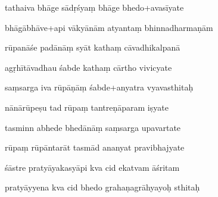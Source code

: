 \documentclass[article,12pt,a4paper]{memoir}%
\newcounter{parCount}
\begin{document}
	  
	  \pstart {} tathaiva bhāge sādṛśyaṃ bhāge bhedo+avasīyate 
	{}
	\pend%
      

	  
	  \pstart \leavevmode%
	bhāgābhāve+api vākyānām atyantaṃ bhinnadharmaṇām 
	{}
	\pend%
      

	  
	  \pstart {} rūpanāśe padānāṃ syāt kathaṃ cāvadhikalpanā 
	{}
	\pend%
      

	  
	  \pstart \leavevmode%
	agṛhītāvadhau śabde kathaṃ cārtho vivicyate 
	{}
	\pend%
      

	  
	  \pstart {} saṃsarga iva rūpāṇāṃ śabde+anyatra vyavasthitaḥ 
	{}
	\pend%
      

	  
	  \pstart \leavevmode%
	nānārūpeṣu tad rūpaṃ tantreṇāparam iṣyate 
	{}
	\pend%
      

	  
	  \pstart {} tasminn abhede bhedānāṃ saṃsarga upavartate 
	{}
	\pend%
      

	  
	  \pstart \leavevmode%
	rūpaṃ rūpāntarāt tasmād ananyat pravibhajyate 
	{}
	\pend%
      

	  
	  \pstart {} śāstre pratyāyakasyāpi kva cid ekatvam āśritam 
	{}
	\pend%
      

	  
	  \pstart \leavevmode%
	pratyāyyena kva cid bhedo grahaṇagrāhyayoḥ sthitaḥ 
	{}
	\pend%
      
\end{document}

